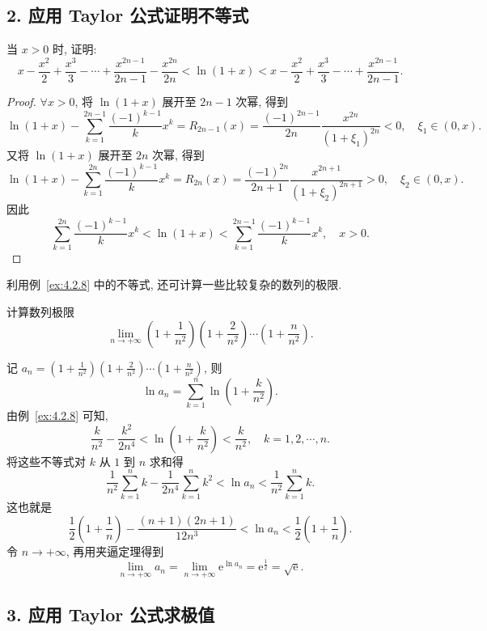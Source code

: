 \subsection*{2. 应用 Taylor 公式证明不等式}

\begin{example}\label{ex:4.2.8}
当 $x>0$ 时, 证明:
\[
x-\frac{x^{2}}{2}+\frac{x^{3}}{3}-\cdots+\frac{x^{2n-1}}{2n-1}-\frac{x^{2n}}{2n}
<\ln(1+x)
<x-\frac{x^{2}}{2}+\frac{x^{3}}{3}-\cdots+\frac{x^{2n-1}}{2n-1}.
\]
\end{example}

\begin{proof}
$\forall x>0$, 将 $\ln(1+x)$ 展开至 $2n-1$ 次幂, 得到
\[
\ln(1+x)-\sum_{k=1}^{2n-1}\frac{(-1)^{k-1}}{k}x^{k}
=R_{2n-1}(x)=\frac{(-1)^{2n-1}}{2n}\frac{x^{2n}}{(1+\xi_{1})^{2n}}<0,\quad\xi_{1}\in(0,x).
\]
又将 $\ln(1+x)$ 展开至 $2n$ 次幂, 得到
\[
\ln(1+x)-\sum_{k=1}^{2n}\frac{(-1)^{k-1}}{k}x^{k}
=R_{2n}(x)=\frac{(-1)^{2n}}{2n+1}\frac{x^{2n+1}}{(1+\xi_{2})^{2n+1}}>0,\quad\xi_{2}\in(0,x).
\]
因此
\[
\sum_{k=1}^{2n}\frac{(-1)^{k-1}}{k}x^{k}<\ln(1+x)<\sum_{k=1}^{2n-1}\frac{(-1)^{k-1}}{k}x^{k},\quad x>0.
\]
\end{proof}

利用例~\ref{ex:4.2.8} 中的不等式, 还可计算一些比较复杂的数列的极限.

\begin{example}\label{ex:4.2.9}
计算数列极限
\[
\lim_{n\to+\infty}\left(1+\frac{1}{n^{2}}\right)\left(1+\frac{2}{n^{2}}\right)\cdots\left(1+\frac{n}{n^{2}}\right).
\]
\end{example}

\begin{solution}
记 $a_{n}=\left(1+\frac{1}{n^{2}}\right)\left(1+\frac{2}{n^{2}}\right)\cdots\left(1+\frac{n}{n^{2}}\right)$, 则
\[
\ln a_{n}=\sum_{k=1}^{n}\ln\left(1+\frac{k}{n^{2}}\right).
\]
由例~\ref{ex:4.2.8} 可知,
\[
\frac{k}{n^{2}}-\frac{k^{2}}{2n^{4}}<\ln\left(1+\frac{k}{n^{2}}\right)<\frac{k}{n^{2}},\quad k=1,2,\cdots,n.
\]
将这些不等式对 $k$ 从 $1$ 到 $n$ 求和得
\[
\frac{1}{n^{2}}\sum_{k=1}^{n}k-\frac{1}{2n^{4}}\sum_{k=1}^{n}k^{2}<\ln a_{n}<\frac{1}{n^{2}}\sum_{k=1}^{n}k.
\]
这也就是
\[
\frac{1}{2}\left(1+\frac{1}{n}\right)-\frac{(n+1)(2n+1)}{12n^{3}}<\ln a_{n}<\frac{1}{2}\left(1+\frac{1}{n}\right).
\]
令 $n \to +\infty$, 再用夹逼定理得到
\[
\lim_{n\to+\infty}a_n=\lim_{n\to+\infty}\mathrm{e}^{\ln a_n}=\mathrm{e}^{\frac{1}{2}}=\sqrt{\mathrm{e}}.
\]
\end{solution}

\subsection*{3. 应用 Taylor 公式求极值}

